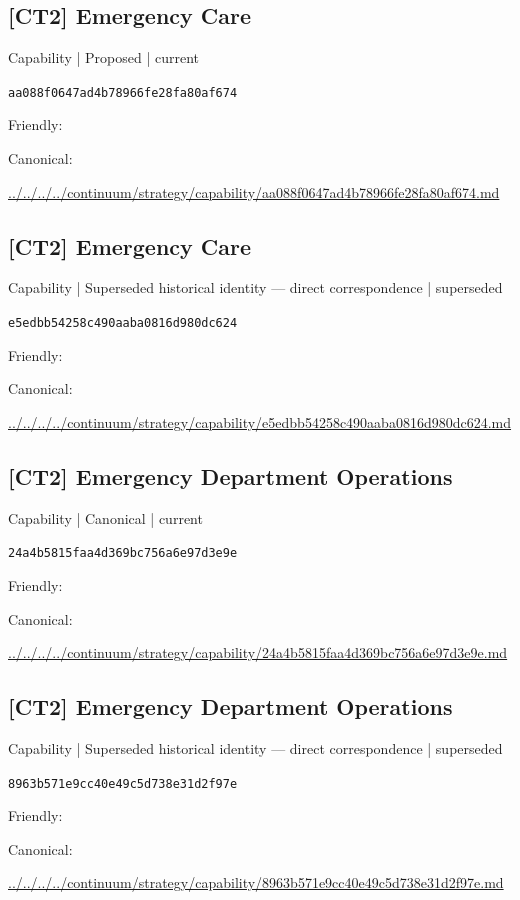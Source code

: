 \documentclass[10pt,a4paper]{article}
\begin{document}
\subsection*{[CT2] Emergency Care}
{\small Capability | Proposed | current}\par
\texttt{aa088f0647ad4b78966fe28fa80af674}\par
Friendly: \par
Canonical: \par
{\footnotesize\url{../../../../continuum/strategy/capability/aa088f0647ad4b78966fe28fa80af674.md}}\par
\subsection*{[CT2] Emergency Care}
{\small Capability | Superseded historical identity — direct correspondence | superseded}\par
\texttt{e5edbb54258c490aaba0816d980dc624}\par
Friendly: \par
Canonical: \par
{\footnotesize\url{../../../../continuum/strategy/capability/e5edbb54258c490aaba0816d980dc624.md}}\par
\subsection*{[CT2] Emergency Department Operations}
{\small Capability | Canonical | current}\par
\texttt{24a4b5815faa4d369bc756a6e97d3e9e}\par
Friendly: \par
Canonical: \par
{\footnotesize\url{../../../../continuum/strategy/capability/24a4b5815faa4d369bc756a6e97d3e9e.md}}\par
\subsection*{[CT2] Emergency Department Operations}
{\small Capability | Superseded historical identity — direct correspondence | superseded}\par
\texttt{8963b571e9cc40e49c5d738e31d2f97e}\par
Friendly: \par
Canonical: \par
{\footnotesize\url{../../../../continuum/strategy/capability/8963b571e9cc40e49c5d738e31d2f97e.md}}\par
\end{document}
